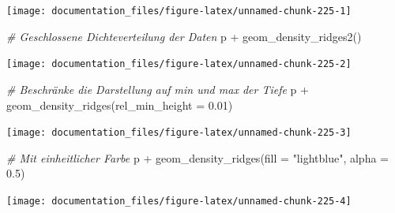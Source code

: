 \documentclass[
]{article}
\newenvironment{Shaded}{\begin{snugshade}}{\end{snugshade}}
\newcommand{\AttributeTok}[1]{\textcolor[rgb]{0.77,0.63,0.00}{#1}}
\newcommand{\CommentTok}[1]{\textcolor[rgb]{0.56,0.35,0.01}{\textit{#1}}}
\newcommand{\FloatTok}[1]{\textcolor[rgb]{0.00,0.00,0.81}{#1}}
\newcommand{\FunctionTok}[1]{\textcolor[rgb]{0.00,0.00,0.00}{#1}}
\newcommand{\NormalTok}[1]{#1}
\newcommand{\SpecialCharTok}[1]{\textcolor[rgb]{0.00,0.00,0.00}{#1}}
\newcommand{\StringTok}[1]{\textcolor[rgb]{0.31,0.60,0.02}{#1}}
\begin{document}
\begin{center}\texttt{[image: documentation\_files/figure-latex/unnamed-chunk-225-1]} \end{center}

\begin{Shaded}
\begin{Highlighting}[]
\CommentTok{\# Geschlossene Dichteverteilung der Daten}
\NormalTok{p }\SpecialCharTok{+} \FunctionTok{geom\_density\_ridges2}\NormalTok{()}
\end{Highlighting}
\end{Shaded}

\begin{center}\texttt{[image: documentation\_files/figure-latex/unnamed-chunk-225-2]} \end{center}

\begin{Shaded}
\begin{Highlighting}[]
\CommentTok{\# Beschränke die Darstellung auf min und max der Tiefe}
\NormalTok{p }\SpecialCharTok{+} \FunctionTok{geom\_density\_ridges}\NormalTok{(}\AttributeTok{rel\_min\_height =} \FloatTok{0.01}\NormalTok{)}
\end{Highlighting}
\end{Shaded}

\begin{center}\texttt{[image: documentation\_files/figure-latex/unnamed-chunk-225-3]} \end{center}

\begin{Shaded}
\begin{Highlighting}[]
\CommentTok{\# Mit einheitlicher Farbe}
\NormalTok{p }\SpecialCharTok{+} \FunctionTok{geom\_density\_ridges}\NormalTok{(}\AttributeTok{fill =} \StringTok{"lightblue"}\NormalTok{, }\AttributeTok{alpha =} \FloatTok{0.5}\NormalTok{)}
\end{Highlighting}
\end{Shaded}

\begin{center}\texttt{[image: documentation\_files/figure-latex/unnamed-chunk-225-4]} \end{center}
\end{document}
